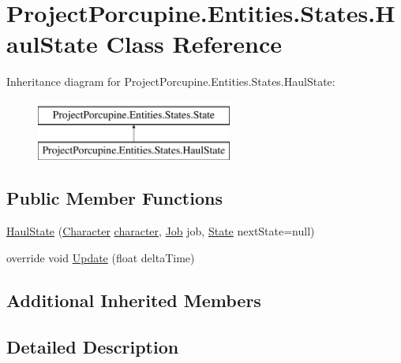 \hypertarget{class_project_porcupine_1_1_entities_1_1_states_1_1_haul_state}{}\section{Project\+Porcupine.\+Entities.\+States.\+Haul\+State Class Reference}
\label{class_project_porcupine_1_1_entities_1_1_states_1_1_haul_state}
Inheritance diagram for Project\+Porcupine.\+Entities.\+States.\+Haul\+State\+:\begin{figure}[H]
\begin{center}
\leavevmode
\includegraphics[height=2.000000cm]{class_project_porcupine_1_1_entities_1_1_states_1_1_haul_state}
\end{center}
\end{figure}
\subsection*{Public Member Functions}
\begin{DoxyCompactItemize}
\item 
\hyperlink{class_project_porcupine_1_1_entities_1_1_states_1_1_haul_state_a8f73f526937fce919ccdbbe4b158c63a}{Haul\+State} (\hyperlink{class_project_porcupine_1_1_entities_1_1_character}{Character} \hyperlink{class_project_porcupine_1_1_entities_1_1_states_1_1_state_a0647dd5dacc8fba22b1c462c954180c7}{character}, \hyperlink{class_job}{Job} job, \hyperlink{class_project_porcupine_1_1_entities_1_1_states_1_1_state}{State} next\+State=null)
\item 
override void \hyperlink{class_project_porcupine_1_1_entities_1_1_states_1_1_haul_state_a67ae03ea7f3d877eb04c86e8594cb09f}{Update} (float delta\+Time)
\end{DoxyCompactItemize}
\subsection*{Additional Inherited Members}


\subsection{Detailed Description}


